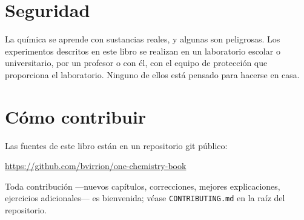 \section*{Seguridad}

La química se aprende con sustancias reales, y algunas son peligrosas.
Los experimentos descritos en este libro se realizan en un laboratorio
escolar o universitario, por un profesor o con él, con el equipo de
protección que proporciona el laboratorio. Ninguno de ellos está pensado
para hacerse en casa.

\section*{Cómo contribuir}

Las fuentes de este libro están en un repositorio git público:
\begin{center}
\url{https://github.com/bvirrion/one-chemistry-book}
\end{center}
Toda contribución ---nuevos capítulos, correcciones, mejores
explicaciones, ejercicios adicionales--- es bienvenida; véase
\texttt{CONTRIBUTING.md} en la raíz del repositorio.
